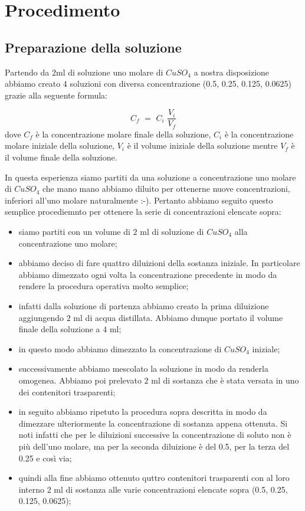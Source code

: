 
\section{Procedimento}

\subsection{Preparazione della soluzione}

Partendo da 2ml di soluzione uno molare di $CuSO_4$ a nostra disposizione abbiamo creato 4 soluzioni con diversa concentrazione (0.5, 0.25, 0.125, 0.0625) grazie alla seguente formula:

\begin{equation}
	C_f \,\, = \,\, C_i \,\, \frac{V_i}{V_f}
	\label{eq:proporzione}
\end{equation}
%
dove $C_f$ è la concentrazione molare finale della soluzione, $C_i$ è la concentrazione molare iniziale della soluzione, $V_i$ è il volume iniziale della soluzione mentre $V_f$ è il volume finale della soluzione.

In questa esperienza siamo partiti da una soluzione a concentrazione uno molare di $CuSO_4$ che mano mano abbiamo diluito per ottenerne nuove concentrazioni, inferiori all'uno molare naturalmente :-).
Pertanto abbiamo seguito questo semplice procediemnto per ottenere la serie di concentrazioni elencate sopra:

\begin{itemize}
	\item{siamo partiti con un volume di $2\,\,\si{\milli\litre}$ di soluzione di $CuSO_4$ alla concentrazione uno molare;}
	\item{abbiamo deciso di fare quattro diluizioni della sostanza iniziale. In particolare abbiamo dimezzato ogni volta la concentrazione precedente in modo da rendere la procedura operativa molto semplice;}
	\item{infatti dalla soluzione di partenza abbiamo creato la prima diluizione aggiungendo $2\,\,\si{\milli\litre}$ di acqua distillata. Abbiamo dunque portato il volume finale della soluzione a $4\,\,\si{\milli\litre}$;}
	\item{in questo modo abbiamo dimezzato la concentrazione di $CuSO_4$ iniziale;}
	\item{successivamente abbiamo mescolato la soluzione in modo da renderla omogenea. Abbiamo poi prelevato $2\,\,\si{\milli\litre}$ di sostanza che è stata versata in uno dei contenitori trasparenti;}
	\item{in seguito abbiamo ripetuto la procedura sopra descritta in modo da dimezzare ulteriormente la concentrazione di sostanza appena ottenuta. Si noti infatti che per le diluizioni successive la concentrazione di soluto non è più dell'uno molare, ma per la seconda diluizione è del 0.5, per la terza del 0.25 e così via;}
	\item{quindi alla fine abbiamo ottenuto quttro contenitori trasparenti con al loro interno $2\,\,\si{\milli\litre}$ di sostanza alle varie concentrazioni elencate sopra (0.5, 0.25, 0.125, 0.0625);}
\end{itemize}

